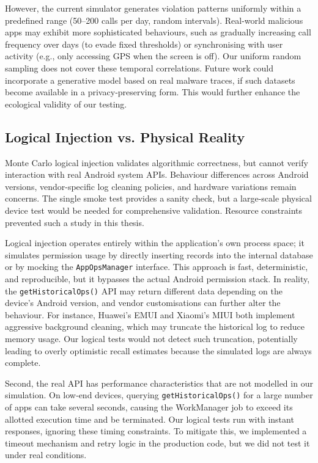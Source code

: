 However, the current simulator generates violation patterns uniformly within a predefined range (50–200 calls per day, random intervals). Real‑world malicious apps may exhibit more sophisticated behaviours, such as gradually increasing call frequency over days (to evade fixed thresholds) or synchronising with user activity (e.g., only accessing GPS when the screen is off). Our uniform random sampling does not cover these temporal correlations. Future work could incorporate a generative model based on real malware traces, if such datasets become available in a privacy‑preserving form. This would further enhance the ecological validity of our testing.

\subsection{Logical Injection vs. Physical Reality}

Monte Carlo logical injection validates algorithmic correctness, but cannot verify interaction with real Android system APIs. Behaviour differences across Android versions, vendor-specific log cleaning policies, and hardware variations remain concerns. The single smoke test provides a sanity check, but a large-scale physical device test would be needed for comprehensive validation. Resource constraints prevented such a study in this thesis.

Logical injection operates entirely within the application's own process space; it simulates permission usage by directly inserting records into the internal database or by mocking the \texttt{AppOpsManager} interface. This approach is fast, deterministic, and reproducible, but it bypasses the actual Android permission stack. In reality, the \texttt{getHistoricalOps()} API may return different data depending on the device's Android version, and vendor customisations can further alter the behaviour. For instance, Huawei's EMUI and Xiaomi's MIUI both implement aggressive background cleaning, which may truncate the historical log to reduce memory usage. Our logical tests would not detect such truncation, potentially leading to overly optimistic recall estimates because the simulated logs are always complete.

Second, the real API has performance characteristics that are not modelled in our simulation. On low‑end devices, querying \texttt{getHistoricalOps()} for a large number of apps can take several seconds, causing the WorkManager job to exceed its allotted execution time and be terminated. Our logical tests run with instant responses, ignoring these timing constraints. To mitigate this, we implemented a timeout mechanism and retry logic in the production code, but we did not test it under real conditions.

